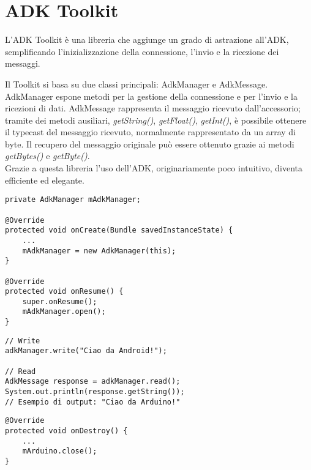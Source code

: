 \section {ADK Toolkit}
L'ADK Toolkit è una libreria che aggiunge un grado di astrazione all'ADK, semplificando 
l'inizializzazione della connessione, l'invio e la ricezione dei messaggi.

Il Toolkit si basa su due classi principali: AdkManager e AdkMessage.	\\	
AdkManager espone metodi per la gestione della connessione e per l'invio e la 
ricezioni di dati. AdkMessage rappresenta il messaggio ricevuto dall'accessorio; 
tramite dei metodi ausiliari, 
\textit{getString()}, \textit{getFloat()}, \textit{getInt()}, è possibile 
ottenere il typecast del messaggio ricevuto, normalmente rappresentato da un array di byte. 
Il recupero del messaggio originale può essere ottenuto grazie ai metodi 
\textit{getBytes()} e \textit{getByte()}.\\
Grazie a questa libreria l'uso dell'ADK, originariamente poco intuitivo, diventa 
efficiente ed elegante.
\begin{lstlisting}[caption=Inizializzazione della connessione con l'accessorio]
private AdkManager mAdkManager;

@Override
protected void onCreate(Bundle savedInstanceState) {
    ...
    mAdkManager = new AdkManager(this);
}

@Override
protected void onResume() {
    super.onResume();
    mAdkManager.open();
}
\end{lstlisting}

\begin{lstlisting}[caption=Lettura e scrittura dati]
// Write
adkManager.write("Ciao da Android!");

// Read
AdkMessage response = adkManager.read();
System.out.println(response.getString());
// Esempio di output: "Ciao da Arduino!"
\end{lstlisting}
\begin{lstlisting}[caption=Chiusura della connessione con l'accessorio]
@Override
protected void onDestroy() {
    ...
    mArduino.close();
}
\end{lstlisting}